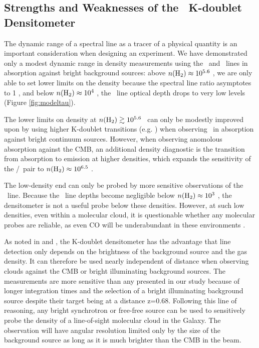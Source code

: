 \subsection{Strengths and Weaknesses of the \formaldehyde\ K-doublet Densitometer}
\label{sec:strengthsweaknesses}
The dynamic range of a spectral line as a tracer of a physical quantity is an
important consideration when designing an experiment.  We have demonstrated
only a modest dynamic range in density measurements using the \oneone\ and
\twotwo\ lines in absorption against bright background sources: above
$n(\textrm{H}_{2})\approx10^{5.6}$ \percc, we are only able to set lower limits on the
density because the spectral line ratio asymptotes to 1 , and below $n(\textrm{H}_{2})\approx10^4$
\percc, the \twotwo\ line optical depth drops to very low levels (Figure
\ref{fig:modeltau}). 

The lower limits on density at $n(\textrm{H}_{2})\gtrsim10^{5.6}$ \percc\ can only be modestly
improved upon by using higher K-doublet transitions (e.g.  \threethree) when
observing \formaldehyde\ in absorption against bright continuum sources.
However, when observing anomolous absorption against the CMB, an additional
density diagnostic is the transition from absorption to emission at higher
densities, which expands the sensitivity of the \oneone/\twotwo\ pair to
$n(\textrm{H}_{2})\approx10^{6.5}$ \percc.

The low-density end can only be probed by more sensitive observations of
the \twotwo\ line.  Because the \formaldehyde\ line depths become negligible
below $n(\textrm{H}_{2})\approx10^3$ \percc, the densitometer is not a useful probe below these
densities.  However, at such low densities, even within a molecular cloud,
it is questionable whether any molecular probes are reliable, as even CO will be
underabundant in these environments \citep[e.g., ][]{Glover2010}.

As noted in \citet{Mangum2008} and \citet{Zeiger2010}, the K-doublet
densitometer has the advantage that line detection only depends on the
brightness of the background source and the gas density.  It can therefore be
used nearly independent of distance when observing clouds against the CMB or
bright illuminating background sources.  The \citet{Zeiger2010} measurements
are more sensitive than any presented in our study because of longer
integration times and the selection of a bright illuminating background source
despite their target being at a distance z=0.68.  Following this line of
reasoning, any bright synchrotron or free-free source can be used to
sensitively probe the density of a line-of-sight molecular cloud in the Galaxy.
The observation will have angular resolution limited only by the size of the
background source as long as it is much brighter than the CMB in the beam.

